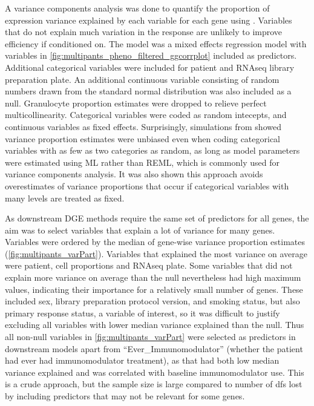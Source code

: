 A variance components analysis was done to quantify the proportion of expression variance explained by each variable for each gene using  \autocite{hoffman2016VariancePartitionInterpretingDrivers}.
Variables that do not explain much variation in the response are unlikely to improve efficiency if conditioned on.
The model was a mixed effects regression model with variables in \autoref{fig:multipants_pheno_filtered_ggcorrplot} included as predictors.
Additional categorical variables were included for patient and \gls{RNAseq} library preparation plate.
An additional continuous variable consisting of random numbers drawn from the standard normal distribution was also included as a null.
Granulocyte proportion estimates were dropped to relieve perfect multicollinearity.
Categorical variables were coded as random intecepts, and continuous variables as fixed effects.
Surprisingly, simulations from \textcite{hoffman2016VariancePartitionInterpretingDrivers} showed variance proportion estimates were unbiased even when coding categorical variables with as few as two categories as random, 
as long as model parameters were estimated using \gls{ML} rather than \gls{REML}, which is commonly used for variance components analysis.
It was also shown this approach avoids overestimates of variance proportions that occur if categorical variables with many levels are treated as fixed.

As downstream \gls{DGE} methods require the same set of predictors for all genes, the aim was to select variables that explain a lot of variance for many genes.
Variables were ordered by the median of gene-wise variance proportion estimates (\autoref{fig:multipants_varPart}).
Variables that explained the most variance on average were patient, cell proportions and \gls{RNAseq} plate.
Some variables that did not explain more variance on average than the null nevertheless had high maximum values, indicating their importance for a relatively small number of genes.
These included sex, library preparation protocol version, and smoking status, but also primary response status, a variable of interest,
so it was difficult to justify excluding all variables with lower median variance explained than the null.
Thus all non-null variables in \autoref{fig:multipants_varPart} were selected as predictors in downstream models apart from \enquote{Ever\_Immunomodulator} 
(whether the patient had ever had immunomodulator treatment), 
as that had both low median variance explained and was correlated with baseline immunomodulator use.
This is a crude approach, but the sample size is large compared to number of \glspl{df} lost by including predictors that may not be relevant for some genes.

